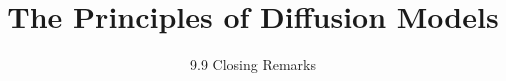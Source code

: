 ﻿%

\title{The Principles of Diffusion Models}
\subtitle{9.9 Closing Remarks}


\begin{frame}
    \titlepage
\end{frame}


